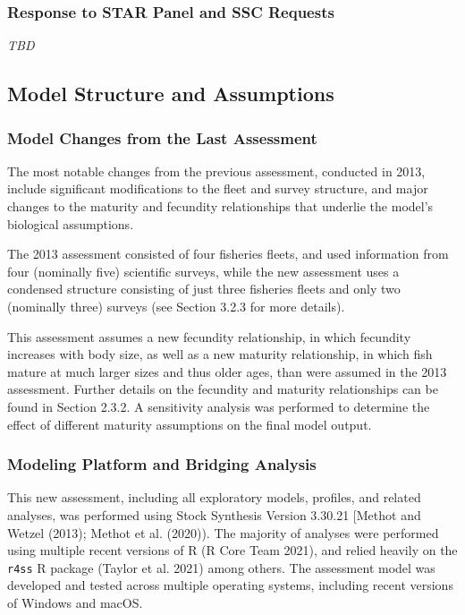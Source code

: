 \documentclass[11pt,
  english,
  letterpaper,
]{article}
\begin{document}
\hypertarget{response-to-star-panel-and-ssc-requests}{%
\subsubsection{Response to STAR Panel and SSC Requests}\label{response-to-star-panel-and-ssc-requests}}

\emph{TBD}

\hypertarget{model-structure-and-assumptions}{%
\subsection{Model Structure and Assumptions}\label{model-structure-and-assumptions}}

\hypertarget{model-changes-from-the-last-assessment}{%
\subsubsection{Model Changes from the Last Assessment}\label{model-changes-from-the-last-assessment}}

The most notable changes from the previous assessment, conducted in 2013, include significant modifications to the fleet and survey structure, and major changes to the maturity and fecundity relationships that underlie the model's biological assumptions.

The 2013 assessment consisted of four fisheries fleets, and used information from four (nominally five) scientific surveys, while the new assessment uses a condensed structure consisting of just three fisheries fleets and only two (nominally three) surveys (see Section 3.2.3 for more details).

This assessment assumes a new fecundity relationship, in which fecundity increases with body size, as well as a new maturity relationship, in which fish mature at much larger sizes and thus older ages, than were assumed in the 2013 assessment. Further details on the fecundity and maturity relationships can be found in Section 2.3.2. A sensitivity analysis was performed to determine the effect of different maturity assumptions on the final model output.

\hypertarget{modeling-platform-and-bridging-analysis}{%
\subsubsection{Modeling Platform and Bridging Analysis}\label{modeling-platform-and-bridging-analysis}}

This new assessment, including all exploratory models, profiles, and related analyses, was performed using Stock Synthesis Version 3.30.21 {[}Methot and Wetzel (2013); Methot et al. (2020)). The majority of analyses were performed using multiple recent versions of R (R Core Team 2021), and relied heavily on the \texttt{r4ss} R package (Taylor et al. 2021) among others. The assessment model was developed and tested across multiple operating systems, including recent versions of Windows and macOS.
\end{document}
